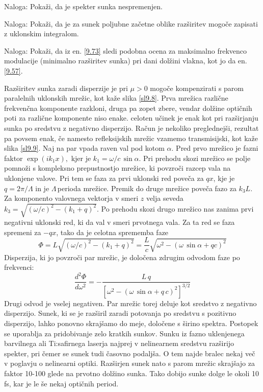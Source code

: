 Naloga: Pokaži, da je spekter sunka nespremenjen.

Naloga: Pokaži, da je za sunek poljubne začetne oblike razširitev
mogoče zapisati z uklonskim integralom.

Naloga: Pokaži, da iz en. \ref{9.73} sledi podobna ocena za maksimalno
frekvenco modulacije (minimalno razširitev sunka) pri dani dolžini
vlakna, kot jo da en. \ref{9.57}.

Razširitev sunka zaradi disperzije je pri $\mu>0$ mogoče kompenzirati
s parom paralelnih uklonskih mrežic, kot kaže slika \ref{sl9.8}.
Prva mrežica različne frekvenčna komponente razkloni, druga pa zopet
zbere, vendar dolžine optičnih poti za različne komponente niso enake.
celoten učinek je enak kot pri razširjanju sunka po sredstvu z negativno
disperzijo. Račun je nekoliko preglednejši, rezultat pa povsem enak,
če namesto refleksijskih mrežic vzamemo transmisijski, kot kaže slika
\ref{sl9.9}. Naj na par vpada raven val pod kotom $\alpha.$ Pred
prvo mrežico je fazni faktor $\exp\left(ik_{1}x\right),$
kjer je $k_{1}=\omega/c\,\sin\alpha$. Pri prehodu skozi mrežico se
polje pomnoži s kompleksno prepustnostjo mrežice, ki povzroči razcep
vala na uklonjene valove. Pri tem se faza za prvi uklonski red poveča
za $qx$, kje je $q=2\pi/\Lambda$ in je $\Lambda\,$perioda mrežice.
Premik do druge mrežice poveča fazo za $k_{3}L$. Za komponento valovnega
vektorja v smeri $z$ velja seveda $k_{3}=\sqrt{\left(\omega/c\right)^{2}-\left(k_{1}+q\right)^{2}}$.
Po prehodu skozi drugo mrežico nas zanima prvi negativni uklonski
red, ki da val v smeri prvotnega vala. Za ta red se faza spremeni
za $-qx$, tako da je celotna sprememba faze 
\begin{equation}
\Phi=L\sqrt{\left(\omega/c\right)^{2}-\left(k_{1}+q\right)^{2}}=
\frac{L}{c}\sqrt{\omega^{2}-\left(\omega\,\sin\alpha+qc\right)^{2}}\label{9.75}
\end{equation}
 Disperzija, ki jo povzroči par mrežic, je določena zdrugim odvodom
faze po frekvenci: 
\begin{equation}
\frac{d^{2}\Phi}{d\omega^{2}}=-\frac{L\, q}{\left[\omega^{2}-\left(\omega\,\sin\alpha+q\, c\right)^{2}\right]^{3/2}}\label{9.76}
\end{equation}
 Drugi odvod je vselej negativen. Par mrežic torej deluje kot sredstvo
z negativno disperzijo. Sunek, ki se je razširil zaradi potovanja
po sredstvu s pozitivno disperzijo, lahko ponovno skrajšamo do meje,
določene s širino spektra. Postopek se uporablja za pridobivanje zelo
kratkih sunkov. Sunku iz fazno uklenjenega barvilnega ali Ti:safirnega
laserja najprej v nelinearnem sredstvu razširijo spekter, pri čemer
se sunek tudi časovno podaljša. O tem najde bralec nekaj več v poglavju
o nelinearni optiki. Razširjen sunek nato s parom mrežic skrajšajo
za faktor 10-100 glede na prvotno dolžino sunka. Tako dobijo sunke
dolge le okoli 10 fs, kar je le še nekaj optičnih period.


